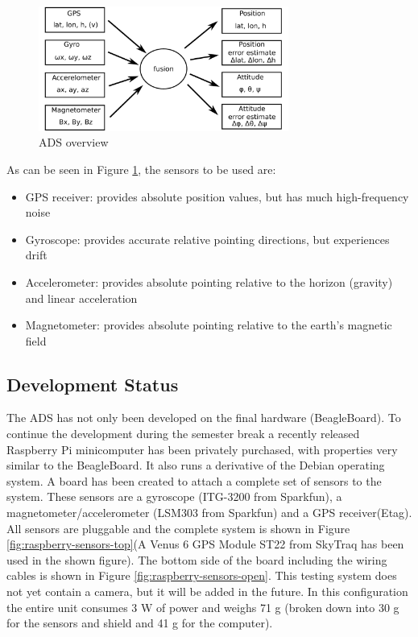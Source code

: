 \begin{figure}
\centering
\includegraphics[width=0.73\textwidth]{figures/ADS_diagram.pdf}
\caption{\acl{ADS} overview}
\label{fig:ADS_overview}
\end{figure}

\noindent
As can be seen in Figure \ref{fig:ADS_overview}, the sensors to be used are:

\begin{itemize}
\item \ac{GPS} receiver: provides absolute position values, but has much high-frequency noise
\item Gyroscope: provides accurate relative pointing directions, but experiences drift
\item Accelerometer: provides absolute pointing relative to the horizon (gravity) and linear acceleration
\item Magnetometer: provides absolute pointing relative to the earth's magnetic field
\end{itemize}

\subsection{Development Status}

The \ac{ADS} has not only been developed on the final hardware (BeagleBoard). To continue the development during the semester break a recently released Raspberry Pi minicomputer \cite{website:raspberry} has been privately purchased, with properties very similar to the BeagleBoard. It also runs a derivative of the Debian operating system. A board has been created to attach a complete set of sensors to the system. These sensors are a gyroscope (ITG-3200 from Sparkfun), a magnetometer/accelerometer (LSM303 from Sparkfun) and a \ac{GPS} receiver(Etag). All sensors are pluggable and the complete system is shown in Figure \ref{fig:raspberry-sensors-top}(A Venus 6 \ac{GPS} Module ST22 from SkyTraq has been used in the shown figure). The bottom side of the board including the wiring cables is shown in Figure \ref{fig:raspberry-sensors-open}. This testing system does not yet contain a camera, but it will be added in the future. In this configuration the entire unit consumes 3 W of power and weighs 71 g (broken down into 30 g for the sensors and shield and 41 g for the computer).

